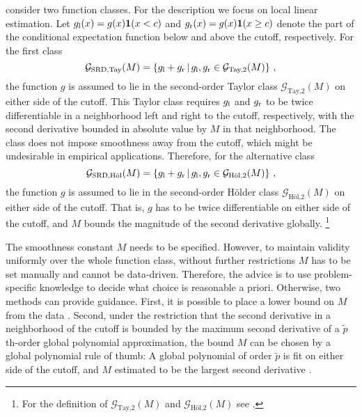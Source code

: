 \citeauthor{Armstrong_2020} consider two function classes.
For the description we focus on local linear estimation.
Let $g_{\textup{l}}(x) = g(x)\mathbf{1}(x<c)$ and $g_{\textup{r}}(x) = g(x)\mathbf{1}(x \geq c)$
denote the part of the conditional expectation function below and above the cutoff, respectively.
For the first class
\begin{equation}
	\mathcal{G}_{\text{SRD,Tay}}(M) = \left\{ g_{\textup{l}} + g_{\textup{r}} \,|\, g_{\textup{l}}, g_{\textup{r}} \in \mathcal{G}_{\text{Tay,2}}(M) \right\} \,,
\end{equation}
the function $g$ is assumed to lie in the second-order Taylor class $\mathcal{G}_{\text{Tay,2}}(M)$ on either side of the cutoff.
This Taylor class requires $g_{\textup{l}}$ and $g_{\textup{r}}$ to be twice differentiable in a neighborhood left and right to the cutoff, respectively,
with the second derivative bounded in absolute value by $M$ in that neighborhood.
The class does not impose smoothness away from the cutoff, which might be undesirable in empirical applications.
Therefore, for the alternative class
\begin{equation}
	\mathcal{G}_{\text{SRD,Höl}}(M) = \left\{ g_{\textup{l}} + g_{\textup{r}} \,|\, g_{\textup{l}}, g_{\textup{r}} \in \mathcal{G}_{\text{Höl,2}}(M) \right\} \,,
\end{equation}
the function $g$ is assumed to lie in the second-order Hölder class $\mathcal{G}_{\text{Höl,2}}(M)$ on either side of the cutoff.
That is, $g$ has to be twice differentiable on either side of the cutoff,
and $M$ bounds the magnitude of the second derivative globally.%
\footnote{For the definition of $\mathcal{G}_{\text{Tay,2}}(M)$ and $\mathcal{G}_{\text{Höl,2}}(M)$ see \textcite[16]{Armstrong_2020}.}

The smoothness constant $M$ needs to be specified.
However, to maintain validity uniformly over the whole function class,
without further restrictions $M$ has to be set manually and cannot be data-driven.
Therefore, the advice is to use problem-specific knowledge to decide what choice is reasonable a priori.
Otherwise, two methods can provide guidance.
First, it is possible to place a lower bound on $M$ from the data \parencite[Supplement]{Kolesar_2018}.
Second, under the restriction that the second derivative in a neighborhood of the cutoff
is bounded by the maximum second derivative of a $\tilde{p}$th-order global polynomial approximation,
the bound $M$ can be chosen by a global polynomial rule of thumb:
A global polynomial of order $\tilde{p}$ is fit on either side of the cutoff,
and $M$ estimated to be the largest second derivative \parencite[Supplement]{Armstrong_2020}.

